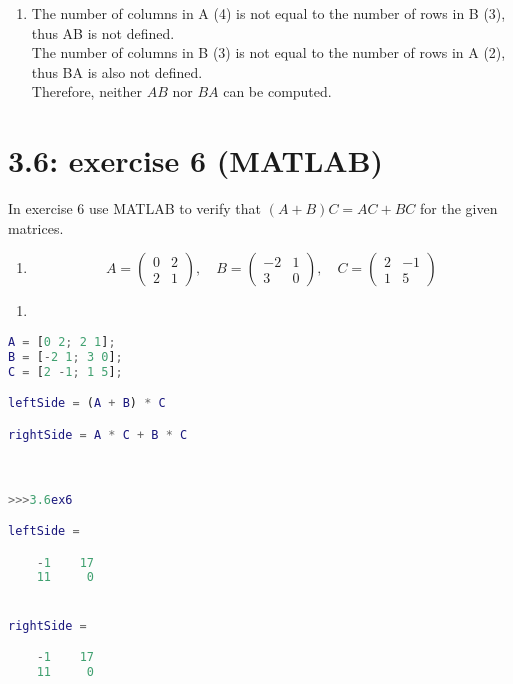 \documentclass{report}
\begin{document}
\sol

\begin{enumerate}
\item[(3)]
The number of columns in A (4) is not equal to the number of rows in B (3), thus AB is not defined.\\
The number of columns in B (3) is not equal to the number of rows in A (2), thus BA is also not defined.\\

Therefore, neither $AB$ nor $BA$ can be computed.

\end{enumerate}












\section*{3.6: exercise 6 (MATLAB)} 
In exercise 6 use MATLAB to
verify that $(A+B)C = AC+BC$ for the given matrices.

\begin{enumerate}
    \item[(6)] 
\begin{equation*}
A = \begin{pmatrix} 0 & 2 \\ 2 & 1 \end{pmatrix}, \quad
B = \begin{pmatrix} -2 & 1 \\ 3 & 0 \end{pmatrix}, \quad
C = \begin{pmatrix} 2 & -1 \\ 1 & 5 \end{pmatrix}
\end{equation*}
    
\end{enumerate}

\sol 

\begin{enumerate}
\item[(6)] 
\end{enumerate}

\begin{lstlisting}[language=Matlab, caption={MATLAB code}, xleftmargin=\parindent]
A = [0 2; 2 1];
B = [-2 1; 3 0];
C = [2 -1; 1 5];

leftSide = (A + B) * C

rightSide = A * C + B * C



>>>3.6ex6

leftSide =

    -1    17
    11     0


rightSide =

    -1    17
    11     0

\end{lstlisting}
\end{document}
